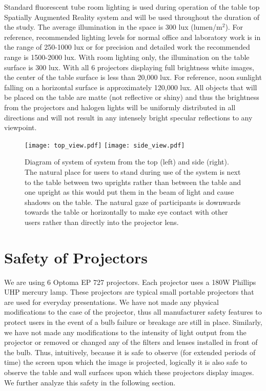 \documentclass[10pt]{article}
\begin{document}
Standard fluorescent tube room lighting is used during operation of
the table top Spatially Augmented Reality system and will be used
throughout the duration of the study.  The average illumination in the
space is 300 lux (lumen/m$^2$).  For reference, recommended lighting
levels for normal office and laboratory work is in the range of
250-1000 lux or for precision and detailed work the recommended range
is 1500-2000 lux.  With room lighting only, the illumination on the
table surface is 300 lux.  With all 6 projectors displaying full
brightness white images, the center of the table surface is less than
20,000 lux.  For reference, noon sunlight falling on a horizontal
surface is approximately 120,000 lux.  All objects that will be placed
on the table are matte (not reflective or shiny) and thus the
brightness from the projectors and halogen lights will be uniformly
distributed in all directions and will not result in any intensely
bright specular reflections to any viewpoint.

\begin{figure}[t]
  \begin{center}
    \texttt{[image: top\_view.pdf]} \hfill
    \texttt{[image: side\_view.pdf]}
  \end{center}
  \caption{Diagram of system of system from the top (left) and side
    (right).  The natural place for users to stand during use of the
    system is next to the table between two uprights rather than
    between the table and one upright as this would put them in the
    beam of light and cause shadows on the table. The natural gaze of
    participants is downwards towards the table or horizontally to
    make eye contact with other users rather than directly into the
    projector lens.
\label{FIGURE_system_diagram}
}
\end{figure}

\section{Safety of Projectors}

We are using 6 Optoma EP 727 projectors.  Each projector uses a 180W
Phillips UHP mercury lamp.  These projectors are typical small
portable projectors that are used for everyday presentations.  We have
not made any physical modifications to the case of the projector, thus
all manufacturer safety features to protect users in the event of a
bulb failure or breakage are still in place.  Similarly, we have not
made any modifications to the intensity of light output from the
projector or removed or changed any of the filters and lenses
installed in front of the bulb.  Thus, intuitively, because it is safe
to observe (for extended periods of time) the screen upon which the
image is projected, logically it is also safe to observe the table and
wall surfaces upon which these projectors display images.  We further
analyze this safety in the following section.
\end{document}
